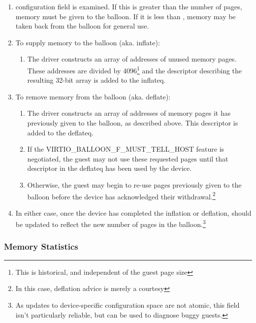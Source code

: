 \begin{enumerate}
\item {} configuration field is examined. If this is
  greater than the  number of pages, memory must be given
  to the balloon. If it is less than ,
  memory may be taken back from the balloon for general
  use.

\item To supply memory to the balloon (aka. inflate):
  \begin{enumerate}
  \item The driver constructs an array of addresses of unused memory
    pages. These addresses are divided by 4096\footnote{This is historical, and independent of the guest page size
} and the descriptor
    describing the resulting 32-bit array is added to the inflateq.
  \end{enumerate}

\item To remove memory from the balloon (aka. deflate):
  \begin{enumerate}
  \item The driver constructs an array of addresses of memory pages
    it has previously given to the balloon, as described above.
    This descriptor is added to the deflateq.

  \item If the VIRTIO_BALLOON_F_MUST_TELL_HOST feature is negotiated, the
    guest may not use these requested pages until that descriptor
    in the deflateq has been used by the device.

  \item Otherwise, the guest may begin to re-use pages previously
    given to the balloon before the device has acknowledged their
    withdrawal.\footnote{In this case, deflation advice is merely a courtesy
}
  \end{enumerate}

\item In either case, once the device has completed the inflation or
  deflation,  should be
  updated to reflect the new number of pages in the balloon.\footnote{As updates to device-specific configuration space are not atomic, this field
isn't particularly reliable, but can be used to diagnose buggy guests.
}
\end{enumerate}

\subsubsection{Memory Statistics}\label{sec:Device Types / Memory Balloon Device / Device Operation / Memory Statistics}


